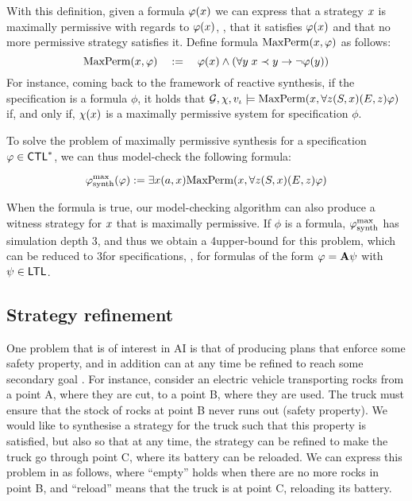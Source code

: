 With this definition, given a formula $\phi(\var)$ we can express that a strategy $\var$
  is maximally permissive with regards to  $\phi(\var)$, \ie, that
  it satisfies $\phi(\var)$ and that no more permissive strategy
  satisfies it. Define formula $\maxperm(\var,\phi)$ as
  follows:
  \[\maxperm(\var,\phi) \quad := \quad \phi(\var) \wedge (\forall \varb \;
    \var \refinesstr \varb \impl \neg \phi(\varb))\]
  For instance, coming back to the framework of reactive synthesis, if
the specification is a  \CTLs formula $\phi$, it holds that
  $\CGS,\assign,\pos_\init\models \maxperm(\var,\forall \varc
  \bind[S]{\var}\bind[E]{\varc}\phi)$ if, and only
  if, $\assign(\var)$ is a maximally permissive system for
  specification $\phi$.

To solve the problem of maximally permissive synthesis for a specification $\phi\in\CTLs$,  we can thus model-check the
following \SLref formula:

\[\phisynthmp(\phi):=\exists\var (\ag,\var) \maxperm(\var,\forall \varc
  \bind[S]{\var}\bind[E]{\varc}\phi)\]

When the formula is true, our model-checking algorithm can also
produce a witness strategy for $\var$ that is maximally permissive.
If $\phi$ is a \CTLs formula, $\phisynthmp$ has simulation depth 3,
and thus we obtain a 4\EXPTIME upper-bound for this problem, which can
be reduced to 3\EXPTIME for \LTL specifications, \ie, for formulas of
the form $\phi=\A\psi$ with $\psi\in\LTL$.



\subsection{Strategy refinement}
\label{sec-plan-B}

One problem that is of interest in AI is
that of producing plans that enforce some safety property, and in addition
can at any time be refined to reach some secondary goal \cite{WrightMN18,PercassiG19}. For instance,
consider an electric vehicle transporting rocks from a point A, where
they are cut, to a point B, where they are used. The truck must ensure
that the stock of rocks at point B never runs out (safety property). We would like to synthesise a
strategy for the truck such that  this property is satisfied, but also
so that at any time, the strategy can be refined to make the truck go
through point C, where its battery can be reloaded.
We can express  this problem in \SLref as follows, where ``empty''
holds when there are no more rocks in point B, and ``reload'' means
that the truck is at point C, reloading its battery.

